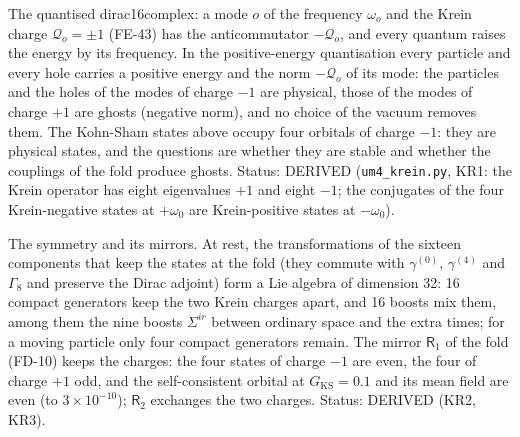 \documentclass[
  10pt,
]{article}
\begin{document}
The quantised dirac16complex: a mode \(o\) of the frequency \(\omega_o\)
and the Krein charge \(\mathcal{Q}_o = \pm1\) (FE-43) has the
anticommutator \(-\mathcal{Q}_o\), and every quantum raises the energy
by its frequency. In the positive-energy quantisation every particle and
every hole carries a positive energy and the norm \(-\mathcal{Q}_o\) of
its mode: the particles and the holes of the modes of charge \(-1\) are
physical, those of the modes of charge \(+1\) are ghosts (negative
norm), and no choice of the vacuum removes them. The Kohn-Sham states
above occupy four orbitals of charge \(-1\): they are physical states,
and the questions are whether they are stable and whether the couplings
of the fold produce ghosts. Status: DERIVED (\texttt{um4\_krein.py},
KR1: the Krein operator has eight eigenvalues \(+1\) and eight \(-1\);
the conjugates of the four Krein-negative states at \(+\omega_0\) are
Krein-positive states at \(-\omega_0\)).

The symmetry and its mirrors. At rest, the transformations of the
sixteen components that keep the states at the fold (they commute with
\(\gamma^{(0)}\), \(\gamma^{(4)}\) and \(\Gamma_8\) and preserve the
Dirac adjoint) form a Lie algebra of dimension 32: 16 compact generators
keep the two Krein charges apart, and 16 boosts mix them, among them the
nine boosts \(\Sigma^{ir}\) between ordinary space and the extra times;
for a moving particle only four compact generators remain. The mirror
\(\mathsf{R}_1\) of the fold (FD-10) keeps the charges: the four states
of charge \(-1\) are even, the four of charge \(+1\) odd, and the
self-consistent orbital at \(G_{\mathrm{KS}} = 0.1\) and its mean field
are even (to \(3\times10^{-10}\)); \(\mathsf{R}_2\) exchanges the two
charges. Status: DERIVED (KR2, KR3).
\end{document}
